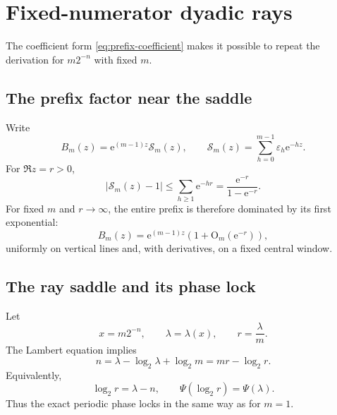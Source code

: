 \documentclass[11pt,oneside]{article}
\theoremstyle{definition}
\theoremstyle{remark}
\newcommand{\e}{\mathrm e}
\newcommand{\bigO}{\mathrm O}
\newcommand{\Prefix}{\mathcal S}
\newcommand{\TM}{\varepsilon}
\begin{document}
\section{Fixed-numerator dyadic rays}
\label{sec:fixed-numerator}

The coefficient form \eqref{eq:prefix-coefficient} makes it possible to repeat the derivation for $m2^{-n}$ with fixed $m$.

\subsection{The prefix factor near the saddle}

Write
\begin{equation}
 B_m(z)=\e^{(m-1)z}\Prefix_m(z),
 \qquad
 \Prefix_m(z)=\sum_{h=0}^{m-1}\TM_h\e^{-hz}.
\label{eq:Sm-def}
\end{equation}
For $\Re z=r>0$,
\begin{equation}
 |\Prefix_m(z)-1|
 \le\sum_{h\ge1}\e^{-hr}
 =\frac{\e^{-r}}{1-\e^{-r}}.
\label{eq:Sm-bound}
\end{equation}
For fixed $m$ and $r\to\infty$, the entire prefix is therefore dominated by its first exponential:
\begin{equation}
 B_m(z)=\e^{(m-1)z}\left(1+\bigO_m(\e^{-r})\right),
\label{eq:Bm-dominant}
\end{equation}
uniformly on vertical lines and, with derivatives, on a fixed central window.

\subsection{The ray saddle and its phase lock}

Let
\begin{equation}
 x=m2^{-n},
 \qquad
 \lambda=\lambda(x),
 \qquad
 r=\frac\lambda m.
\label{eq:fixed-m-parameters}
\end{equation}
The Lambert equation implies
\begin{equation}
 n=\lambda-\log_2\lambda+\log_2m
 =mr-\log_2r.
\label{eq:fixed-m-saddle-relation}
\end{equation}
Equivalently,
\begin{equation}
 \log_2r=\lambda-n,
 \qquad
 \Psi(\log_2r)=\Psi(\lambda).
\label{eq:fixed-m-phase-lock}
\end{equation}
Thus the exact periodic phase locks in the same way as for $m=1$.
\end{document}

